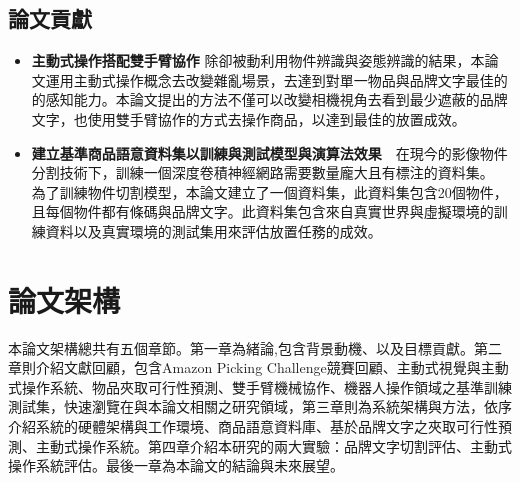 \subsection{論文貢獻}
\begin{itemize}
\item \textbf{主動式操作搭配雙手臂協作} 除卻被動利用物件辨識與姿態辨識的結果，本論文運用主動式操作概念去改變雜亂場景，去達到對單一物品與品牌文字最佳的的感知能力。本論文提出的方法不僅可以改變相機視角去看到最少遮蔽的品牌文字，也使用雙手臂協作的方式去操作商品，以達到最佳的放置成效。
\item \textbf{建立基準商品語意資料集以訓練與測試模型與演算法效果}　在現今的影像物件分割技術下，訓練一個深度卷積神經網路需要數量龐大且有標注的資料集。
為了訓練物件切割模型，本論文建立了一個資料集，此資料集包含20個物件，且每個物件都有條碼與品牌文字。此資料集包含來自真實世界與虛擬環境的訓練資料以及真實環境的測試集用來評估放置任務的成效。
\end{itemize}

\section{論文架構}
本論文架構總共有五個章節。第一章為緒論,包含背景動機、以及目標貢獻。第二章則介紹文獻回顧，包含Amazon Picking Challenge競賽回顧、主動式視覺與主動式操作系統、物品夾取可行性預測、雙手臂機械協作、機器人操作領域之基準訓練測試集，快速瀏覽在與本論文相關之研究領域，第三章則為系統架構與方法，依序介紹系統的硬體架構與工作環境、商品語意資料庫、基於品牌文字之夾取可行性預測、主動式操作系統。第四章介紹本研究的兩大實驗：品牌文字切割評估、主動式操作系統評估。最後一章為本論文的結論與未來展望。

